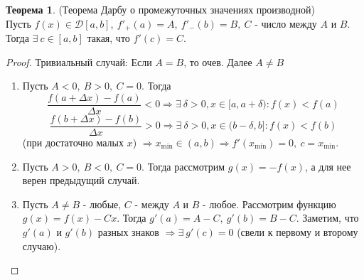 \documentclass[a4paper, 12pt]{article}
\theoremstyle{definition}
\newtheorem*{theorem}{Теорема}
\begin{document}
        \begin{theorem} (Теорема Дарбу о промежуточных значениях производной)\\
            Пусть $f(x)\in \mathcal{D}[a,b],\ f'_+(a)=A,\ f'_-(b)=B,\ C$ - число между $A$ и $B$. Тогда $\exists\ c\in [a,b]$ такая, что $f'(c)=C$.
        \end{theorem} 
        \begin{proof}
            Тривиальный случай: Если $A=B$, то очев. Далее $A\ne B$
            \begin{enumerate}
                \item Пусть $A<0,\ B>0,\ C=0$. Тогда
                \[\frac{f(a+\Delta x)-f(a)}{\Delta x}<0 \Rightarrow \exists\ \delta>0, x\in [a,a+\delta): f(x)<f(a)\] 
                \[\frac{f(b+\Delta x)-f(b)}{\Delta x}>0 \Rightarrow \exists\ \delta>0, x\in (b-\delta, b]: f(x)<f(b)\]
                (при достаточно малых $x$)
                $\Rightarrow x_{\min}\in(a,b) \Rightarrow f'(x_{\min})=0,\ c=x_{\min}$.
                \item Пусть $A>0,\ B<0,\ C=0$. Тогда рассмотрим $g(x)=-f(x)$, а для нее верен предыдущий случай.
                \item Пусть $A\ne B$ - любые, $C$ - между $A$ и $B$ - любое. Рассмотрим функцию $g(x)=f(x)-Cx$. Тогда $g'(a)=A-C,\ g'(b)=B-C$. Заметим, что $g'(a)$ и $g'(b)$ разных знаков $\Rightarrow \exists\ g'(c)=0$ (свели к первому и второму случаю).
            \end{enumerate}
        \end{proof} 
\end{document}

